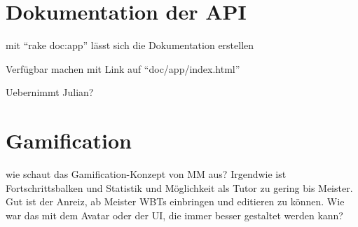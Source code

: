 \section{Dokumentation der API}
\begin {k}
mit "`rake doc:app"' lässt sich die Dokumentation erstellen

Verfügbar machen mit Link auf "`doc/app/index.html"'

Uebernimmt Julian?
\end{k}

\section{Gamification}\label{ref:gamificationConcept}
\begin{k}
wie schaut das Gamification-Konzept von MM aus? Irgendwie ist Fortschrittsbalken
und Statistik und Möglichkeit als Tutor zu gering bis Meister. Gut ist der
Anreiz, ab Meister WBTs einbringen und editieren zu können. Wie war das mit dem
Avatar oder der UI, die immer besser gestaltet werden kann?
\end{k}